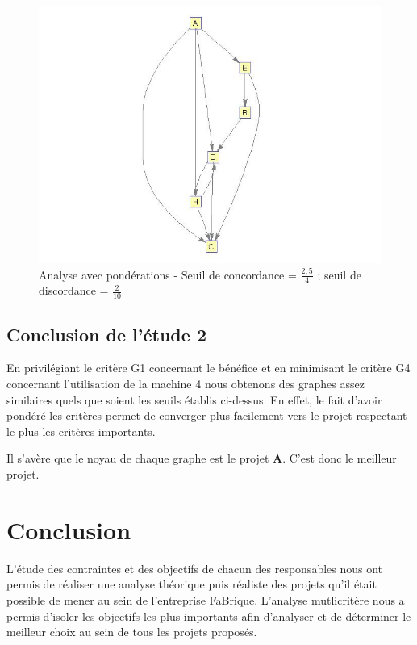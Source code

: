 \documentclass[a4paper,10pt]{article}
\begin{document}
\begin{figure}[H]
\begin{center}
\includegraphics[scale=0.3]{img/G4-pond.jpg}
\caption{Analyse avec pondérations - Seuil de concordance = $\frac{2,5}{4}$ ; seuil de discordance = $\frac{2}{10}$}
\end{center}
\end{figure}

\subsection{Conclusion de l'étude 2}

En privilégiant le critère G1 concernant le bénéfice et en minimisant le critère G4 concernant l'utilisation de la machine 4 nous obtenons des graphes assez similaires quels que soient les seuils établis ci-dessus. En effet, le fait d'avoir pondéré les critères permet de converger plus facilement vers le projet respectant le plus les critères importants.

Il s'avère que le noyau de chaque graphe est le projet \textbf{A}. C'est donc le meilleur projet.

\section{Conclusion}

L'étude des contraintes et des objectifs de chacun des responsables nous ont permis de réaliser une analyse théorique puis réaliste des projets qu'il était possible de mener au sein de l'entreprise FaBrique. L'analyse mutlicritère nous a permis d'isoler les objectifs les plus importants afin d'analyser et de déterminer le meilleur choix au sein de tous les projets proposés. 
\end{document}
